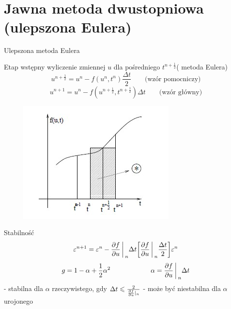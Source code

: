 \section{Jawna metoda dwustopniowa (ulepszona Eulera)}
\begin{frame}{Ulepszona metoda Eulera}
	\begin{block}{Etap wstępny}
	wyliczenie zmiennej $u$ dla pośredniego $t^{n+\frac{1}{2}}$( metoda Eulera)
    $$u^{n+\frac{1}{2}} = u^n - f(u^n,t^n)\frac{\Delta t}{2} \qquad \text{(wzór pomocniczy)}$$
    $$u^{n+1} = u^n - f(u^{n+\frac{1}{2}},t^{n+\frac{1}{2}})\Delta t \qquad \text{(wzór główny)}$$
    \end{block}
\end{frame}
\begin{frame}
	 \begin{figure}
	\includegraphics[height=0.6\textheight]{img/22/metoda_skokowa.jpg}
	\end{figure}
\end{frame}
\begin{frame}{Stabilność}
	$$\varepsilon^{n+1} = \varepsilon^n - \frac{\partial f}{\partial u}\bigg\arrowvert_n\Delta t\bigg[\frac{\partial f}{\partial u} \bigg\arrowvert_n\frac{\Delta t}{2}\bigg]\varepsilon^n$$
    $$g = 1-\alpha +\frac{1}{2}\alpha^2 \qquad \qquad \qquad \alpha = \frac{\partial f}{\partial u}\bigg\arrowvert_n \Delta t$$
    \newline
    - stabilna dla $\alpha$ rzeczywistego, gdy $\Delta t \leqslant \frac{2}{\frac{\partial f}{\partial u}\arrowvert_n}$
    \newline
    - może być niestabilna dla $\alpha$ urojonego
\end{frame}
